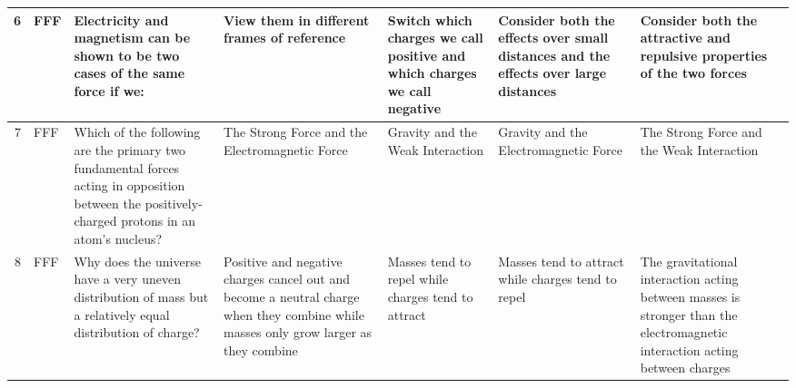 \documentclass[10pt]{article}
\begin{document}
\begin{tiny}
\begin{longtable}{r|p{0.375in}|p{1.275in}|p{0.75in}|p{0.75in}|p{0.75in}|p{0.75in}}
    6     &     FFF &                                                                                                                                                                                                  Electricity and magnetism can be shown to be two cases of the same force if we: &                                                                                            View them in different frames of reference &                              Switch which charges we call positive and which charges we call negative &                                        Consider both the effects over small distances and the effects over large distances &                                                           Consider both the attractive and repulsive properties of the two forces \\\hline
    7     &     FFF &                                                                                                                                  Which of the following are the primary two fundamental forces acting in opposition between the positively-charged protons in an atom's nucleus? &                                                                                        The Strong Force and the Electromagnetic Force &                                                                      Gravity and the Weak Interaction &                                                                                      Gravity and the Electromagnetic Force &                                                                                         The Strong Force and the Weak Interaction \\\hline
    8     &     FFF &                                                                                                                                                                     Why does the universe have a very uneven distribution of mass but a relatively equal distribution of charge? &  Positive and negative charges cancel out and become a neutral charge when they combine while masses only grow larger as they combine &                                                    Masses tend to repel while charges tend to attract &                                                                         Masses tend to attract while charges tend to repel &       The gravitational interaction acting between masses is stronger than the electromagnetic interaction acting between charges \\\hline

\end{longtable}
\end{tiny}
\end{document}
